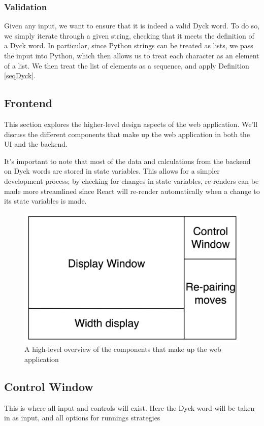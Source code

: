 \subsubsection{Validation}
Given any input, we want to ensure that it is indeed a valid Dyck word. To do so, we simply iterate through a given string, checking that it meets the definition of a Dyck word. In particular, since Python strings can be treated as lists, we pass the input into Python, which then allows us to treat each character as an element of a list. We then treat the list of elements as a sequence, and apply Definition \ref{seqDyck}. 

\subsection{Frontend}
This section explores the higher-level design aspects of the web application. We'll discuss the different components that make up the web application in both the UI and the backend.

\par\null\par
\noindent It's important to note that most of the data and calculations from the backend on Dyck words are stored in state variables. This allows for a simpler development process; by checking for changes in state variables, re-renders can be made more streamlined since React will re-render automatically when a change to its state variables is made. 

\begin{figure}[H]
    \centering
    \includegraphics[scale=0.1]{./figures/webBreakdown.png}
    \caption{A high-level overview of the components that make up the web application}
\end{figure}

\subsection{Control Window}
This is where all input and controls will exist. Here the Dyck word will be taken in as input, and all options for runnings strategies
